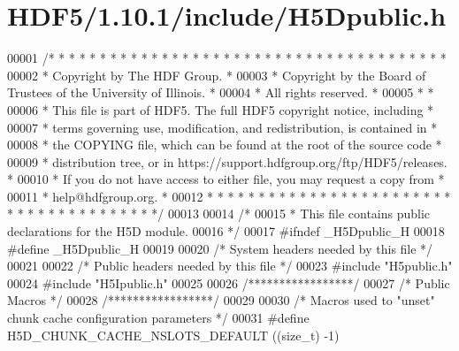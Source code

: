 \hypertarget{_h_d_f5_21_810_81_2include_2_h5_dpublic_8h_source}{}\section{H\+D\+F5/1.10.1/include/\+H5\+Dpublic.h}
\label{_h_d_f5_21_810_81_2include_2_h5_dpublic_8h_source}

\begin{DoxyCode}
00001 \textcolor{comment}{/* * * * * * * * * * * * * * * * * * * * * * * * * * * * * * * * * * * * * * *}
00002 \textcolor{comment}{ * Copyright by The HDF Group.                                               *}
00003 \textcolor{comment}{ * Copyright by the Board of Trustees of the University of Illinois.         *}
00004 \textcolor{comment}{ * All rights reserved.                                                      *}
00005 \textcolor{comment}{ *                                                                           *}
00006 \textcolor{comment}{ * This file is part of HDF5.  The full HDF5 copyright notice, including     *}
00007 \textcolor{comment}{ * terms governing use, modification, and redistribution, is contained in    *}
00008 \textcolor{comment}{ * the COPYING file, which can be found at the root of the source code       *}
00009 \textcolor{comment}{ * distribution tree, or in https://support.hdfgroup.org/ftp/HDF5/releases.  *}
00010 \textcolor{comment}{ * If you do not have access to either file, you may request a copy from     *}
00011 \textcolor{comment}{ * help@hdfgroup.org.                                                        *}
00012 \textcolor{comment}{ * * * * * * * * * * * * * * * * * * * * * * * * * * * * * * * * * * * * * * */}
00013 
00014 \textcolor{comment}{/*}
00015 \textcolor{comment}{ * This file contains public declarations for the H5D module.}
00016 \textcolor{comment}{ */}
00017 \textcolor{preprocessor}{#ifndef \_H5Dpublic\_H}
00018 \textcolor{preprocessor}{#define \_H5Dpublic\_H}
00019 
00020 \textcolor{comment}{/* System headers needed by this file */}
00021 
00022 \textcolor{comment}{/* Public headers needed by this file */}
00023 \textcolor{preprocessor}{#include "H5public.h"}
00024 \textcolor{preprocessor}{#include "H5Ipublic.h"}
00025 
00026 \textcolor{comment}{/*****************/}
00027 \textcolor{comment}{/* Public Macros */}
00028 \textcolor{comment}{/*****************/}
00029 
00030 \textcolor{comment}{/* Macros used to "unset" chunk cache configuration parameters */}
00031 \textcolor{preprocessor}{#define H5D\_CHUNK\_CACHE\_NSLOTS\_DEFAULT      ((size\_t) -1)}

\end{DoxyCode}
